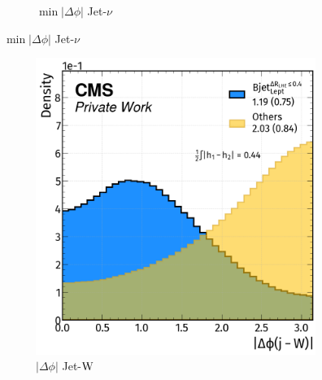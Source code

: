 \begin{figure}[H]
\begin{subfigure}{0.48\linewidth}
        \caption{$\min |\Delta \phi|$ Jet-$\nu$}
    \end{subfigure}  
\end{figure}
\newpage
\begin{figure}[H]
    \ContinuedFloat
    \vspace{-0.5cm}
    \centering
        \begin{subfigure}{0.49\linewidth}
        \centering
        \includegraphics[width=1\linewidth]{fig//chap08-kin_reco/dphi_W.png}
        \caption{$|\Delta \phi|$ Jet-${\text{W}}$}
    \end{subfigure}
    \hfill
    \begin{subfigure}{0.46\linewidth}  
        \centering

\end{subfigure}
\end{figure}
